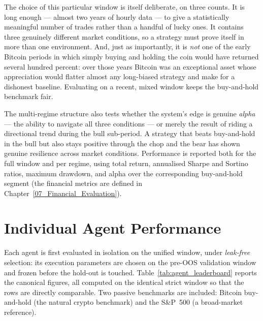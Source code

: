 The choice of this particular window is itself deliberate, on three counts. It is long enough --- almost two years of hourly data --- to give a statistically meaningful number of trades rather than a handful of lucky ones. It contains three genuinely different market conditions, so a strategy must prove itself in more than one environment. And, just as importantly, it is \textit{not} one of the early Bitcoin periods in which simply buying and holding the coin would have returned several hundred percent: over those years Bitcoin was an exceptional asset whose appreciation would flatter almost any long-biased strategy and make for a dishonest baseline. Evaluating on a recent, mixed window keeps the buy-and-hold benchmark fair.


The multi-regime structure also tests whether the system's edge is genuine \textit{alpha} --- the ability to navigate all three conditions --- or merely the result of riding a directional trend during the bull sub-period. A strategy that beats buy-and-hold in the bull but also stays positive through the chop and the bear has shown genuine resilience across market conditions. Performance is reported both for the full window and per regime, using total return, annualised Sharpe and Sortino ratios, maximum drawdown, and alpha over the corresponding buy-and-hold segment (the financial metrics are defined in Chapter~\ref{07_Financial_Evaluation}).

\section{Individual Agent Performance}
\label{sec:individual_agents}

Each agent is first evaluated in isolation on the unified window, under \textit{leak-free} selection: its execution parameters are chosen on the pre-OOS validation window and frozen before the hold-out is touched. Table~\ref{tab:agent_leaderboard} reports the canonical figures, all computed on the identical strict window so that the rows are directly comparable. Two passive benchmarks are included: Bitcoin buy-and-hold (the natural crypto benchmark) and the S\&P~500 (a broad-market reference).

